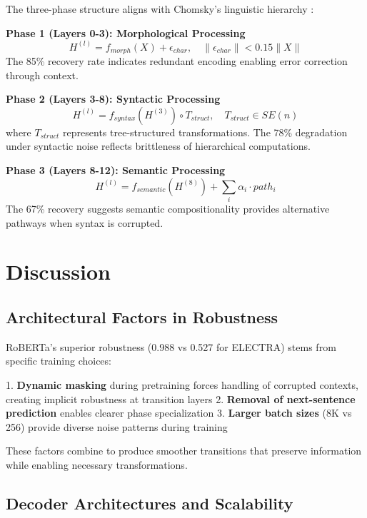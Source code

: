 \documentclass{article}
\begin{document}
The three-phase structure aligns with Chomsky's linguistic hierarchy \cite{chomsky1957syntactic}:

\textbf{Phase 1 (Layers 0-3): Morphological Processing}
\begin{equation}
H^{(l)} = f_{morph}(X) + \epsilon_{char}, \quad \|\epsilon_{char}\| < 0.15\|X\|
\end{equation}
The 85\% recovery rate indicates redundant encoding enabling error correction through context.

\textbf{Phase 2 (Layers 3-8): Syntactic Processing}
\begin{equation}
H^{(l)} = f_{syntax}(H^{(3)}) \circ T_{struct}, \quad T_{struct} \in SE(n)
\end{equation}
where $T_{struct}$ represents tree-structured transformations. The 78\% degradation under syntactic noise reflects brittleness of hierarchical computations.

\textbf{Phase 3 (Layers 8-12): Semantic Processing}
\begin{equation}
H^{(l)} = f_{semantic}(H^{(8)}) + \sum_{i} \alpha_i \cdot path_i
\end{equation}
The 67\% recovery suggests semantic compositionality provides alternative pathways when syntax is corrupted.

\section{Discussion}

\subsection{Architectural Factors in Robustness}

RoBERTa's superior robustness (0.988 vs 0.527 for ELECTRA) stems from specific training choices:

1. \textbf{Dynamic masking} during pretraining forces handling of corrupted contexts, creating implicit robustness at transition layers
2. \textbf{Removal of next-sentence prediction} enables clearer phase specialization
3. \textbf{Larger batch sizes} (8K vs 256) provide diverse noise patterns during training

These factors combine to produce smoother transitions that preserve information while enabling necessary transformations.

\subsection{Decoder Architectures and Scalability}
\end{document}
